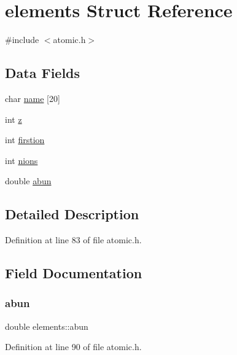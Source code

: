 \hypertarget{structelements}{}\section{elements Struct Reference}
\label{structelements}


{\ttfamily \#include $<$atomic.\+h$>$}

\subsection*{Data Fields}
\begin{DoxyCompactItemize}
\item 
char \hyperlink{structelements_ac6a5e682babab0bc79f63d6395f3837e}{name} \mbox{[}20\mbox{]}
\item 
int \hyperlink{structelements_aae9cca99fda4810bda33b861f9fbd70b}{z}
\item 
int \hyperlink{structelements_a309aeae50d0264cd963f1a1815ce604e}{firstion}
\item 
int \hyperlink{structelements_a90866d4e99cc142553839ad5e8f13dbc}{nions}
\item 
double \hyperlink{structelements_a72235377dd9fdab9cc49404b11a294c3}{abun}
\end{DoxyCompactItemize}


\subsection{Detailed Description}


Definition at line 83 of file atomic.\+h.



\subsection{Field Documentation}
\mbox{\label{structelements_a72235377dd9fdab9cc49404b11a294c3}} 
\subsubsection{\texorpdfstring{abun}{abun}}
{\footnotesize\ttfamily double elements\+::abun}



Definition at line 90 of file atomic.\+h.

\mbox{\label{structelements_a309aeae50d0264cd963f1a1815ce604e}} 
